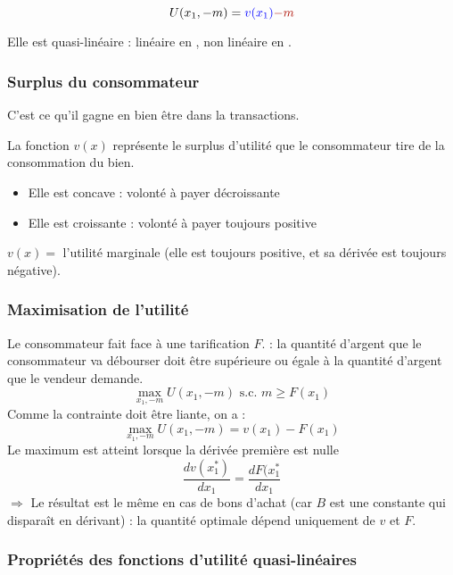 \begin{equation*}
U(x_1, -m) = \textblue{v(x_1)} \textred{-m}
\end{equation*}

Elle est quasi-linéaire : linéaire en , non linéaire en .

\subsubsection{Surplus du consommateur}

C'est ce qu'il gagne en bien être dans la transactions.

La fonction $v(x)$ représente le surplus d'utilité que le consommateur tire de la consommation du bien.
\begin{itemize}
\item Elle est concave : volonté à payer décroissante
\item Elle est croissante : volonté à payer toujours positive
\end{itemize}
$v(x) =$ l'utilité marginale (elle est toujours positive, et sa dérivée est toujours négative).

\subsubsection{Maximisation de l'utilité}

Le consommateur fait face à une tarification $F$.  : la quantité d'argent que le consommateur va débourser doit être supérieure ou égale à la quantité d'argent que le vendeur demande.
\begin{equation*}
\max_{x_1, -m} U(x_1, -m) \text{ s.c. } m \geq F(x_1)
\end{equation*}
Comme la contrainte doit être liante, on a :
\begin{equation*}
\max_{x_1, -m} U(x_1, -m) = v(x_1) - F(x_1)
\end{equation*}
Le maximum est atteint lorsque la dérivée première est nulle
\begin{equation*}
\frac{d v(x_1^*)}{dx_1} = \frac{dF(x_1^*}{dx_1}
\end{equation*}
$\Rightarrow$ Le résultat est le même en cas de bons d'achat (car $B$ est une constante qui disparaît en dérivant) : la quantité optimale dépend uniquement de $v$ et $F$.

\subsubsection{Propriétés des fonctions d'utilité quasi-linéaires}

